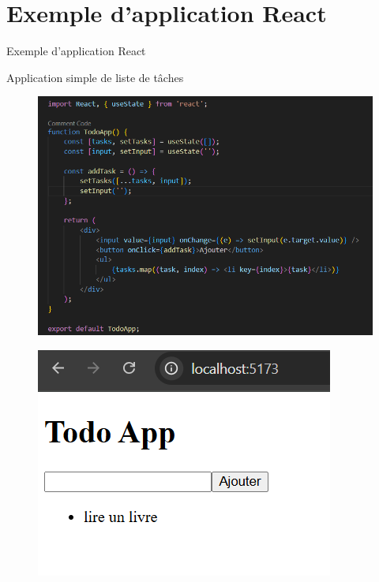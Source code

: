 \documentclass{clbeamer2024}
\begin{document}
	\section{Exemple d'application React}
	\begin{frame}{Exemple d'application React}
		\begin{exampleblock}{Application simple de liste de tâches}
			
			\begin{figure}[h] %
				\centering
				\begin{minipage}{0.67\textwidth}
					\centering
					\includegraphics[width=\linewidth]{images/code7.png}
					\label{fig:image1}
				\end{minipage}
				\hfill %
				\begin{minipage}{0.29\textwidth}
					\centering
					\includegraphics[width=\linewidth]{images/resultat4.png}
					\label{fig:image2}
				\end{minipage}
			\end{figure}
			
			
		\end{exampleblock}
	\end{frame}
	
\end{document}
